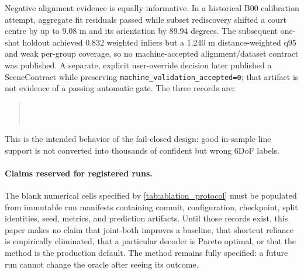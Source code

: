 Negative alignment evidence is equally informative.  In a historical B00
calibration attempt, aggregate fit residuals passed while subset rediscovery
shifted a court centre by up to 9.08 m and its orientation by 89.94 degrees.
The subsequent one-shot holdout achieved 0.832 weighted inliers but a 1.240 m
distance-weighted q95 and weak per-group coverage, so no machine-accepted
alignment/dataset contract was published.  A separate, explicit user-override
decision later published a SceneContract while preserving
\texttt{machine\_validation\_accepted=0}; that artifact is not evidence of a
passing automatic gate.  The three records are:
\begin{quote}\small
{}\\
\\
\end{quote}
This is the intended behavior of the fail-closed design: good
in-sample line support is not converted into thousands of confident but wrong
6DoF labels.

\paragraph{Claims reserved for registered runs.}
The blank numerical cells specified by \cref{tab:ablation_protocol} must be
populated from immutable run manifests containing commit, configuration,
checkpoint, split identities, seed, metrics, and prediction artifacts.  Until
those records exist, this paper makes no claim that joint-both improves a
baseline, that shortcut reliance is empirically eliminated, that a particular
decoder is Pareto optimal, or that the method is the production default.  The
method remains fully specified: a future run cannot change the oracle after
seeing its outcome.


